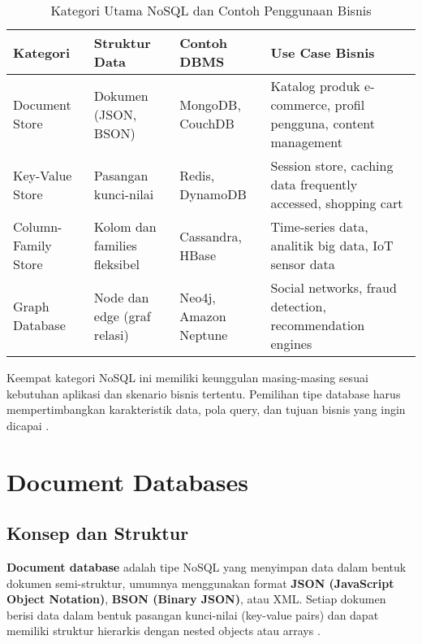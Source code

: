 \begin{table}[h]
	\centering
	\renewcommand{\arraystretch}{1.3}
	\caption{Kategori Utama NoSQL dan Contoh Penggunaan Bisnis}
	\label{tab:nosql_categories}
	\begin{tabular}{|p{}|p{}|p{}|p{}|}
		\hline
		\textbf{Kategori} & \textbf{Struktur Data} & \textbf{Contoh DBMS} & \textbf{Use Case Bisnis} \\
		\hline
		Document Store & Dokumen (JSON, BSON) & MongoDB, CouchDB & Katalog produk e-commerce, profil pengguna, content management \\
		\hline
		Key-Value Store & Pasangan kunci-nilai & Redis, DynamoDB & Session store, caching data frequently accessed, shopping cart \\
		\hline
		Column-Family Store & Kolom dan families fleksibel & Cassandra, HBase & Time-series data, analitik big data, IoT sensor data \\
		\hline
		Graph Database & Node dan edge (graf relasi) & Neo4j, Amazon Neptune & Social networks, fraud detection, recommendation engines \\
		\hline
	\end{tabular}
\end{table}

Keempat kategori NoSQL ini memiliki keunggulan masing-masing sesuai kebutuhan aplikasi dan skenario bisnis tertentu. Pemilihan tipe database harus mempertimbangkan karakteristik data, pola query, dan tujuan bisnis yang ingin dicapai \cite{gandomi2015, moniruzzaman2013nosql}.



\section{Document Databases}

\subsection{Konsep dan Struktur}

\textbf{Document database} adalah tipe NoSQL yang menyimpan data dalam bentuk dokumen semi-struktur, umumnya menggunakan format \textbf{JSON (JavaScript Object Notation)}, \textbf{BSON (Binary JSON)}, atau XML. Setiap dokumen berisi data dalam bentuk pasangan kunci-nilai (key-value pairs) dan dapat memiliki struktur hierarkis dengan nested objects atau arrays \cite{moniruzzaman2013nosql, han2011survey}.

